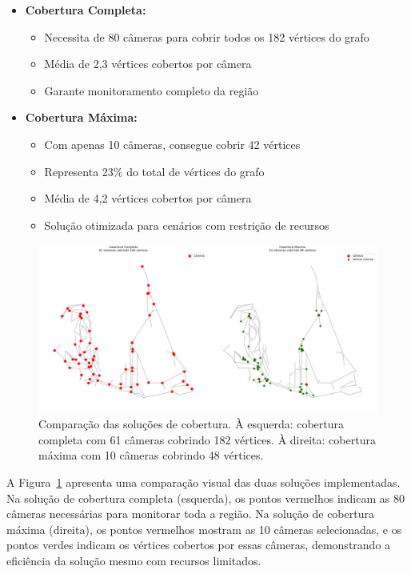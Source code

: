 \documentclass[12pt, a4paper]{report}
\begin{document}
\begin{itemize}
    \item \textbf{Cobertura Completa:}
    \begin{itemize}
        \item Necessita de 80 câmeras para cobrir todos os 182 vértices do grafo
        \item Média de 2,3 vértices cobertos por câmera
        \item Garante monitoramento completo da região
    \end{itemize}
    
    \item \textbf{Cobertura Máxima:}
    \begin{itemize}
        \item Com apenas 10 câmeras, consegue cobrir 42 vértices
        \item Representa 23\% do total de vértices do grafo
        \item Média de 4,2 vértices cobertos por câmera
        \item Solução otimizada para cenários com restrição de recursos
    \end{itemize}
\end{itemize}

\begin{figure}[H]
    \centering
    \includegraphics[width=\textwidth]{resultados/visualizacao_cobertura}
    \caption{Comparação das soluções de cobertura. À esquerda: cobertura completa com 61 câmeras cobrindo 182 vértices. À direita: cobertura máxima com 10 câmeras cobrindo 48 vértices.}
    \label{fig:visualizacao_cobertura}
\end{figure}

A Figura~\ref{fig:visualizacao_cobertura} apresenta uma comparação visual das duas soluções implementadas. Na solução de cobertura completa (esquerda), os pontos vermelhos indicam as 80 câmeras necessárias para monitorar toda a região. Na solução de cobertura máxima (direita), os pontos vermelhos mostram as 10 câmeras selecionadas, e os pontos verdes indicam os vértices cobertos por essas câmeras, demonstrando a eficiência da solução mesmo com recursos limitados.
\end{document}
